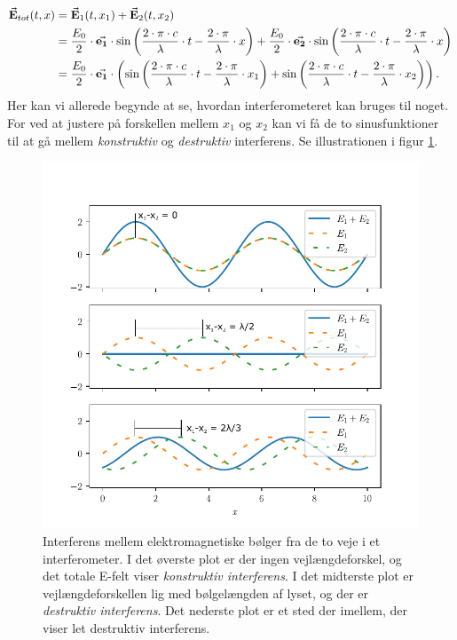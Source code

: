 \documentclass[crop=false, class=memoir]{standalone}
\begin{document}
%
\begin{align}
    \va{E}_{tot}(t, x) &= \va{E}_1(t, x_1) + \va{E}_2(t, x_2)\\
    &= \frac{E_{0}}{2} \cdot \va{e_1} \cdot \sin\left(\frac{2\cdot\pi\cdot c}{\lambda} \cdot t - \frac{2\cdot\pi}{\lambda} \cdot x\right)  + \frac{E_0}{2} \cdot \va{e_2} \cdot \sin\left(\frac{2\cdot\pi\cdot c}{\lambda} \cdot t - \frac{2\cdot\pi}{\lambda} \cdot x\right)\\
    &= \frac{E_0}{2} \cdot \va{e_1} \cdot \left(   
    \sin\left(\frac{2\cdot\pi\cdot c}{\lambda} \cdot t - \frac{2\cdot\pi}{\lambda} \cdot x_1\right)
    + \sin\left(\frac{2\cdot\pi\cdot c}{\lambda} \cdot t - \frac{2\cdot\pi}{\lambda} \cdot x_2\right)
    \right).
\end{align}
%
Her kan vi allerede begynde at se, hvordan interferometeret kan bruges til noget. For ved at justere på forskellen mellem $x_1$ og $x_2$ kan vi få de to sinusfunktioner til at gå mellem \emph{konstruktiv} og \emph{destruktiv} interferens. Se illustrationen i figur \ref{laser:fig:interferens}. 

\begin{figure}
    \centering
    \includegraphics[width=0.5\linewidth]{Laserfysik/billeder/interferens.pdf}
    \caption{Interferens mellem elektromagnetiske bølger fra de to veje i et interferometer. I det øverste plot er der ingen vejlængdeforskel, og det totale E-felt viser \emph{konstruktiv interferens}. I det midterste plot er vejlængdeforskellen lig med bølgelængden af lyset, og der er \emph{destruktiv interferens}. Det nederste plot er et sted der imellem, der viser let destruktiv interferens.}
    \label{laser:fig:interferens}
\end{figure}
\end{document}
